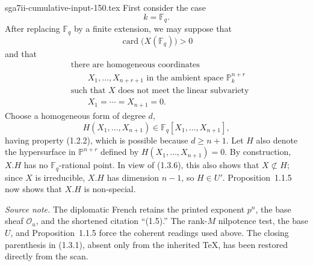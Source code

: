 \begin{filecontents*}{sga7ii-cumulative-input-150.tex}
First consider the case
\begin{equation}\tag{1.3.5}
k=\mathbb F_q.
\end{equation}
After replacing $\mathbb F_q$ by a finite extension, we may suppose that
\begin{equation}\tag{1.3.6}
\operatorname{card}\bigl(X(\mathbb F_q)\bigr)>0
\end{equation}
and that
\begin{equation}\tag{1.3.7}
\begin{aligned}
&\text{there are homogeneous coordinates}\\
&\qquad X_1,\dots,X_{n+r+1}\text{ in the ambient space }\mathbb P_k^{n+r}\\
&\text{such that }X\text{ does not meet the linear subvariety}\\
&\qquad X_1=\cdots=X_{n+1}=0.
\end{aligned}
\end{equation}
Choose a homogeneous form of degree $d$,
\begin{equation}\tag{1.3.8}
H(X_1,\dots,X_{n+1})\in
\mathbb F_q[X_1,\dots,X_{n+1}],
\end{equation}
having property (1.2.2), which is possible because $d\geq n+1$.  Let $H$
also denote the hypersurface in $\mathbb P^{n+r}$ defined by
$H(X_1,\dots,X_{n+1})=0$.  By construction, $X.H$ has no
$\mathbb F_q$-rational point.  In view of (1.3.6), this also shows that
$X\not\subset H$; since $X$ is irreducible, $X.H$ has dimension $n-1$, so
$H\in U'$.  Proposition~1.1.5 now shows that $X.H$ is non-special.

\medskip
\noindent\emph{Source note.}
The diplomatic French retains the printed exponent $p^n$, the base sheaf
$\mathcal O_u$, and the shortened citation ``(1.5).''  The rank-$M$
nilpotence test, the base $U$, and Proposition~1.1.5 force the coherent
readings used above.  The closing parenthesis in (1.3.1), absent only from
the inherited TeX, has been restored directly from the scan.
\end{filecontents*}
